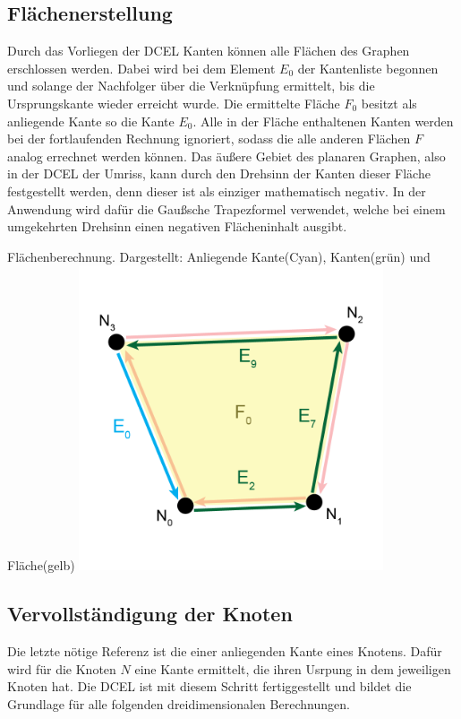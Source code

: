 \subsection{Flächenerstellung}
Durch das Vorliegen der DCEL Kanten können alle Flächen des Graphen erschlossen werden.
Dabei wird bei dem Element $E_0$ der Kantenliste begonnen und solange der Nachfolger über die Verknüpfung ermittelt, bis die Ursprungskante wieder erreicht wurde.
Die ermittelte Fläche $F_0$ besitzt als anliegende Kante so die Kante $E_0$.
Alle in der Fläche enthaltenen Kanten werden bei der fortlaufenden Rechnung ignoriert, sodass die alle anderen Flächen $F$ analog errechnet werden können.
Das äußere Gebiet des planaren Graphen, also in der DCEL der Umriss, kann durch den Drehsinn der Kanten dieser Fläche festgestellt werden, denn dieser ist als einziger mathematisch negativ.
In der Anwendung wird dafür die Gaußsche Trapezformel verwendet, welche bei einem umgekehrten Drehsinn einen negativen Flächeninhalt ausgibt.

\begin{Bild}{Flächenberechnung. Dargestellt: Anliegende Kante(Cyan), Kanten(grün) und Fläche(gelb)}
	\includegraphics[width = 90mm]{Bilder/FlaecheBerechnung}
\end{Bild}

\subsection{Vervollständigung der Knoten}
Die letzte nötige Referenz ist die einer anliegenden Kante eines Knotens.
Dafür wird für die Knoten $N$ eine Kante ermittelt, die ihren Usrpung in dem jeweiligen Knoten hat.
Die DCEL ist mit diesem Schritt fertiggestellt und bildet die Grundlage für alle folgenden dreidimensionalen Berechnungen.\label{key}
